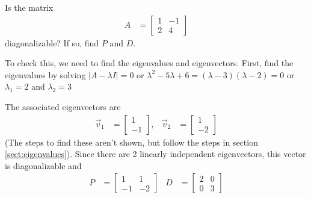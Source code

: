 \begin{example} \label{ex:diag:2by2}
Is the matrix 
%
\begin{align*}
A & = \begin{bmatrix}
1 & -1 \\
2 & 4 
\end{bmatrix}
\end{align*}
diagonalizable?  If so, find $P$ and $D$. 

\solution

To check this, we need to find the eigenvalues and eigenvectors. First, find the eigenvalues by solving $|A-\lambda I|=0$ or $\lambda^2-5\lambda+6=(\lambda-3)(\lambda-2)=0$ or $\lambda_1=2$ and $\lambda_2=3$ 

The associated eigenvectors are 
%
\begin{align*}
\vec{v}_1 &= \begin{bmatrix}
1 \\ -1 
\end{bmatrix}, & \vec{v}_2 & = \begin{bmatrix}
1 \\ -2
\end{bmatrix}
\end{align*}
 (The steps to find these aren't shown, but follow the steps in section  \ref{sect:eigenvalues}).  Since there are 2 linearly independent eigenvectors, this vector is diagonalizable and 
%
\begin{align*}
P & = \begin{bmatrix}
1 & 1 \\ -1 & -2 
\end{bmatrix} & D & = \begin{bmatrix}
2 & 0 \\
0 & 3
\end{bmatrix}
\end{align*}
\end{example}




